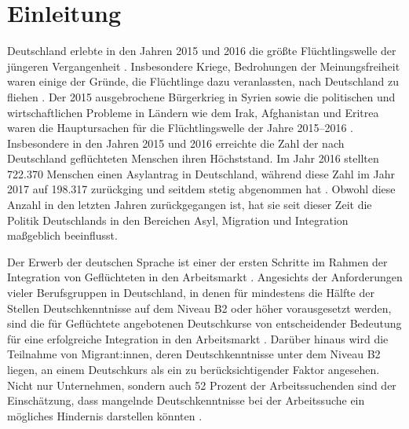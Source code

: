 \chapter{Einleitung}
\label{cha:einleitung}

Deutschland erlebte in den Jahren 2015 und 2016 die größte Flüchtlingswelle der jüngeren Vergangenheit \parencite{brucker2016vorlaufige}. Insbesondere Kriege, Bedrohungen der Meinungsfreiheit waren einige der Gründe, die Flüchtlinge dazu veranlassten, nach Deutschland zu fliehen \parencite[4]{brucker202510}. Der 2015 ausgebrochene Bürgerkrieg in Syrien sowie die politischen und wirtschaftlichen Probleme in Ländern wie dem Irak, Afghanistan und Eritrea waren die Hauptursachen für die Flüchtlingswelle der Jahre 2015–2016 \parencites[4]{unknown}[23--24]{brucker2016vorlaufige}. Insbesondere in den Jahren 2015 und 2016 erreichte die Zahl der nach Deutschland geflüchteten Menschen ihren Höchststand. Im Jahr 2016 stellten 722.370 Menschen einen Asylantrag in Deutschland, während diese Zahl im Jahr 2017 auf 198.317 zurückging und seitdem stetig abgenommen hat \parencite[103]{fur2019migrationsbericht}. Obwohl diese Anzahl in den letzten Jahren zurückgegangen ist, hat sie seit dieser Zeit die Politik Deutschlands in den Bereichen Asyl, Migration und Integration maßgeblich beeinflusst.

Der Erwerb der deutschen Sprache ist einer der ersten Schritte im Rahmen der Integration von Geflüchteten in den Arbeitsmarkt \parencite{Bahr2019Arbeitsmarktintegration}. Angesichts der Anforderungen vieler Berufsgruppen in Deutschland, in denen für mindestens die Hälfte der Stellen Deutschkenntnisse auf dem Niveau B2 oder höher vorausgesetzt werden, sind die für Geflüchtete angebotenen Deutschkurse von entscheidender Bedeutung für eine erfolgreiche Integration in den Arbeitsmarkt \parencite{repec:iab:iabkbe:202607}. Darüber hinaus wird die Teilnahme von Migrant:innen, deren Deutschkenntnisse unter dem Niveau B2 liegen, an einem Deutschkurs als ein zu berücksichtigender Faktor angesehen. Nicht nur Unternehmen, sondern auch 52 Prozent der Arbeitssuchenden sind der Einschätzung, dass mangelnde Deutschkenntnisse bei der Arbeitssuche ein mögliches Hindernis darstellen könnten \parencite{repec:iab:iabkbe:202607}.

